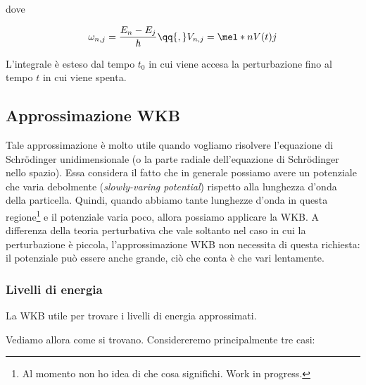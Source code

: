 dove

\begin{equation*}
   \omega_{n,j}=\frac{E_n - E_j}{\hbar}
   \qq{,}
   V_{n,j}=\mel*{n}{V(t)}{j}
\end{equation*}

L'integrale è esteso dal tempo $t_0$ in cui viene accesa la perturbazione fino al tempo $t$ in cui viene spenta.

\subsection*{Approssimazione WKB}

Tale approssimazione è molto utile quando vogliamo risolvere l'equazione di Schrödinger unidimensionale (o la parte radiale dell'equazione di Schrödinger nello spazio). Essa considera il fatto che in generale possiamo avere un potenziale che varia debolmente (\textit{slowly-varing potential}) rispetto alla lunghezza d'onda della particella. Quindi, quando abbiamo tante lunghezze d'onda in questa regione\footnote{Al momento non ho idea di che cosa significhi. Work in progress.} e il potenziale varia poco, allora possiamo applicare la WKB. A differenza della teoria perturbativa che vale soltanto nel caso in cui la perturbazione è piccola, l'approssimazione WKB non necessita di questa richiesta: il potenziale può essere anche grande, ciò che conta è che vari lentamente.

\subsubsection*{Livelli di energia}
La WKB utile per trovare i livelli di energia approssimati.

Vediamo allora come si trovano. Considereremo principalmente tre casi:

